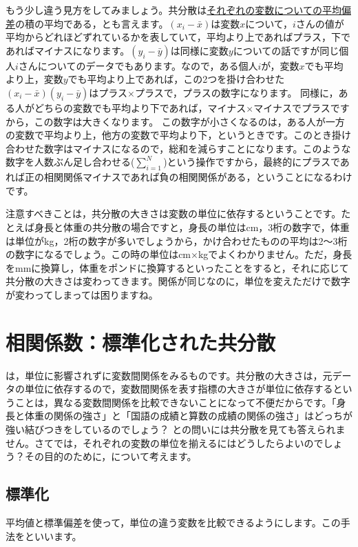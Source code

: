 \documentclass{ltjsbook}
\begin{document}
もう少し違う見方をしてみましょう。共分散は\uline{それぞれの変数についての平均偏差}の積の平均である，とも言えます。$(x_i - \bar{x})$は変数$x$について，$i$さんの値が平均からどれほどずれているかを表していて，平均より上であればプラス，下であればマイナスになります。$(y_i - \bar{y})$は同様に変数$y$についての話ですが同じ個人$i$さんについてのデータでもあります。なので，ある個人$i$が，変数$x$でも平均より上，変数$y$でも平均より上であれば，この2つを掛け合わせた$(x_i - \bar{x})(y_i - \bar{y})$はプラス$\times$プラスで，プラスの数字になります。
同様に，ある人がどちらの変数でも平均より下であれば，マイナス$\times$マイナスでプラスですから，この数字は大きくなります。
この数字が小さくなるのは，ある人が一方の変数で平均より上，他方の変数で平均より下，というときです。このとき掛け合わせた数字はマイナスになるので，総和を減らすことになります。このような数字を人数ぶん足し合わせる($\sum_{i=1}^N$)という操作ですから，最終的にプラスであれば正の相関関係マイナスであれば負の相関関係がある，ということになるわけです。

注意すべきことは，共分散の大きさは変数の単位に依存するということです。たとえば身長と体重の共分散の場合ですと，身長の単位はcm，3桁の数字で，体重は単位がkg，2桁の数字が多いでしょうから，かけ合わせたものの平均は2〜3桁の数字になるでしょう。この時の単位はcm$\times$kgでよくわかりません。ただ，身長をmmに換算し，体重をポンドに換算するといったことをすると，それに応じて共分散の大きさは変わってきます。関係が同じなのに，単位を変えただけで数字が変わってしまっては困りますね。


\section{相関係数：標準化された共分散}
\label{sec:correlation_coefficient}
は，単位に影響されずに変数間関係をみるものです。共分散の大きさは，元データの単位に依存するので，変数間関係を表す指標の大きさが単位に依存するということは，異なる変数間関係を比較できないことになって不便だからです。「身長と体重の関係の強さ」と「国語の成績と算数の成績の関係の強さ」はどっちが強い結びつきをしているのでしょう？ との問いには共分散を見ても答えられません。さてでは，それぞれの変数の単位を揃えるにはどうしたらよいのでしょう？その目的のために，について考えます。

\subsection{標準化}
\label{zScore}
平均値と標準偏差を使って，単位の違う変数を比較できるようにします。この手法をといいます。
\end{document}
